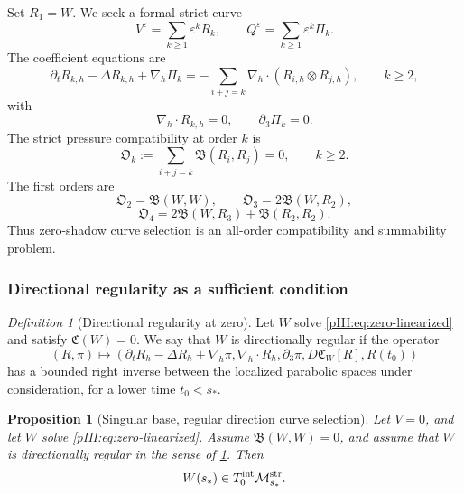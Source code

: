 \documentclass[11pt]{article}
\numberwithin{equation}{section}
\theoremstyle{plain}
\newtheorem{proposition}{Proposition}[section]
\theoremstyle{definition}
\theoremstyle{remark}
\newtheorem{definition}{Definition}[section]
\newcommand{\eps}{\varepsilon}
\newcommand{\nabh}{\nabla_h}
\newcommand{\divh}{\nabla_h\!\cdot}
\newcommand{\Mstr}{\mathcal M^{\rm str}}
\newcommand{\Tint}{T^{\rm int}}
\newcommand{\calB}{\mathfrak B}
\newcommand{\calC}{\mathfrak C}
\begin{document}
Set \(R_1=W\).  We seek a formal strict curve
\begin{equation}\label{pIII:eq:formal-zero-curve}
        V^\eps=\sum_{k\ge1}\eps^kR_k,
        \qquad
        Q^\eps=\sum_{k\ge1}\eps^k\Pi_k.
\end{equation}
The coefficient equations are
\begin{equation}\label{pIII:eq:jet-equation-general}
        \partial_tR_{k,h}-\Delta R_{k,h}+\nabh\Pi_k
        =
        -\sum_{i+j=k}\nabh\cdot(R_{i,h}\otimes R_{j,h}),
        \qquad k\ge2,
\end{equation}
with
\begin{equation}\label{pIII:eq:jet-strict-conditions}
        \divh R_{k,h}=0,
        \qquad
        \partial_3\Pi_k=0.
\end{equation}
The strict pressure compatibility at order \(k\) is
\begin{equation}\label{pIII:eq:obstruction-general}
        \mathfrak O_k
        :=
        \sum_{i+j=k}\calB(R_i,R_j)=0,
        \qquad k\ge2.
\end{equation}
The first orders are
\[
        \mathfrak O_2=\calB(W,W),
        \qquad
        \mathfrak O_3=2\calB(W,R_2),
\]
\[
        \mathfrak O_4=2\calB(W,R_3)+\calB(R_2,R_2).
\]
Thus zero-shadow curve selection is an all-order compatibility and summability problem.

\subsubsection{Directional regularity as a sufficient condition}

\begin{definition}[Directional regularity at zero]\label{pIII:def:directional-regular-zero}
Let \(W\) solve \eqref{pIII:eq:zero-linearized} and satisfy \(\calC(W)=0\).  We say that
\(W\) is directionally regular if the operator
\begin{equation}\label{pIII:eq:directional-operator-zero}
        (R,\pi)
        \mapsto
        \left(
        \partial_tR_h-\Delta R_h+\nabh\pi,
        \divh R_h,
        \partial_3\pi,
        D\calC_W[R],
        R(t_0)
        \right)
\end{equation}
has a bounded right inverse between the localized parabolic spaces under consideration,
for a lower time \(t_0<s_*\).
\end{definition}

\begin{proposition}[Singular base, regular direction curve selection]\label{pIII:prop:zero-directional-curve-selection}
Let \(V=0\), and let \(W\) solve \eqref{pIII:eq:zero-linearized}.  Assume
\(\calB(W,W)=0\), and assume that \(W\) is directionally regular in the sense of
\cref{pIII:def:directional-regular-zero}.  Then
\[
        W(s_*)\in \Tint_0\Mstr_{s_*}.
\]
\end{proposition}
\end{document}
